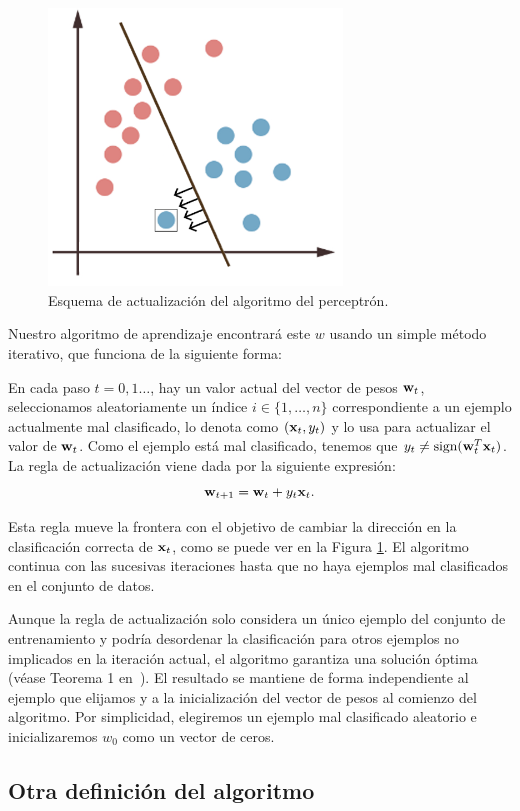 \documentclass[oneside,openright,titlepage,numbers=noenddot,openany,headinclude,footinclude=true,
cleardoublepage=empty,abstractoff,BCOR=5mm,paper=a4,fontsize=12pt,main=spanish]{scrreprt}
\begin{document}
\begin{figure}[h]
	\centering
	\includegraphics[width=7.8cm]{movclassified.png}
	\caption{Esquema de actualización del algoritmo del perceptrón.}
    \label{fig:movsep}
\end{figure}

Nuestro algoritmo de aprendizaje encontrará este $w$ usando un simple método iterativo, que funciona de la siguiente forma:

En cada paso $t=0,1\dots$, hay un valor actual del vector de pesos $\textbf{w}_t$, seleccionamos aleatoriamente un índice $i\in \{1,\dots,n\}$ correspondiente a un ejemplo actualmente mal clasificado, lo denota como $(\textbf{x}_t,y_t)$ y lo usa para actualizar el valor de $\textbf{w}_t$. Como el ejemplo está mal clasificado, tenemos que $y_t\neq \text{sign}(\textbf{w}^T_t\textbf{x}_t)$. La regla de actualización viene dada por la siguiente expresión: $$\textbf{w}_{t+1}=\textbf{w}_t+y_t\textbf{x}_t.$$

Esta regla mueve la frontera con el objetivo de cambiar la dirección en la clasificación correcta de $\textbf{x}_t$, como se puede ver en la Figura \ref{fig:movsep}. El algoritmo continua con las sucesivas iteraciones hasta que no haya ejemplos mal clasificados en el conjunto de datos.

Aunque la regla de actualización solo considera un único ejemplo del conjunto de entrenamiento y podría desordenar la clasificación para otros ejemplos no implicados en la iteración actual, el algoritmo garantiza una solución óptima (véase Teorema 1 en~\cite{perceptronproof2012}). El resultado se mantiene de forma independiente al ejemplo que elijamos y a la inicialización del vector de pesos al comienzo del algoritmo. Por simplicidad, elegiremos un ejemplo mal clasificado aleatorio e inicializaremos $w_0$ como un vector de ceros.

\subsection*{Otra definición del algoritmo}
\end{document}
